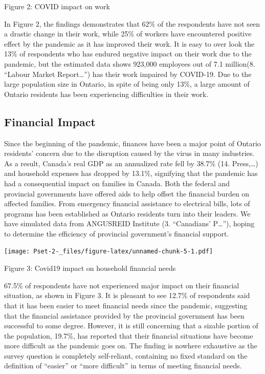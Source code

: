 \documentclass[
]{article}
\begin{document}
Figure 2: COVID impact on work

In Figure 2, the findings demonstrates that 62\% of the respondents have
not seen a drastic change in their work, while 25\% of workers have
encountered positive effect by the pandemic as it has improved their
work. It is easy to over look the 13\% of respondents who has endured
negative impact on their work due to the pandemic, but the estimated
data shows 923,000 employees out of 7.1 million(8. ``Labour Market
Report\ldots{}'') has their work impaired by COVID-19. Due to the large
population size in Ontario, in spite of being only 13\%, a large amount
of Ontario residents has been experiencing difficulties in their work.

\hypertarget{financial-impact}{%
\subsection{Financial Impact}\label{financial-impact}}

Since the beginning of the pandemic, finances have been a major point of
Ontario residents' concern due to the disruption caused by the virus in
many industries. As a result, Canada's real GDP as an annualized rate
fell by 38.7\% (14. Press,\ldots) and household expenses has dropped by
13.1\%, signifying that the pandemic has had a consequential impact on
families in Canada. Both the federal and provincial governments have
offered aids to help offset the financial burden on affected families.
From emergency financial assistance to electrical bills, lots of
programs has been established as Ontario residents turn into their
leaders. We have simulated data from ANGUSREID Institute (3.
``Canadians' P\ldots{}''), hoping to determine the efficiency of
provincial government's financial support.

\texttt{[image: Pset-2-\_files/figure-latex/unnamed-chunk-5-1.pdf]}

Figure 3: Covid19 impact on household financial needs

67.5\% of respondents have not experienced major impact on their
financial situation, as shown in Figure 3. It is pleasant to see 12.7\%
of respondents said that it has been easier to meet financial needs
since the pandemic, suggesting that the financial assistance provided by
the provincial government has been successful to some degree. However,
it is still concerning that a sizable portion of the population, 19.7\%,
has reported that their financial situations have become more difficult
as the pandemic goes on. The finding is nowhere exhaustive as the survey
question is completely self-reliant, containing no fixed standard on the
definition of ``easier'' or ``more difficult'' in terms of meeting
financial needs.
\end{document}
